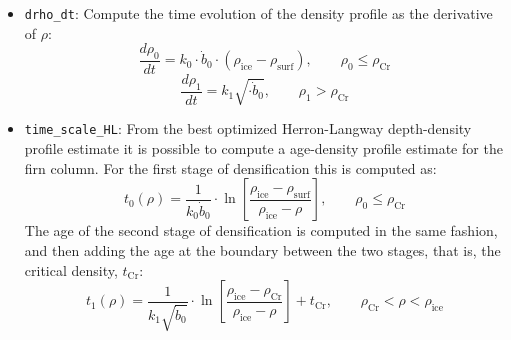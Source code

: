 \documentclass[../../CompleteThesis/Complete_1stDraft.tex]{subfiles}
\begin{document}
\begin{itemize}
	\item \lstinline[columns=fixed]|drho_dt|: Compute the time evolution of the density profile as the derivative of $\rho$:
	\begin{equation}
		\frac{d\rho_0}{dt} = k_0 \cdot\dot{b}_0\cdot (\rho_{\text{ice}} - \rho_{\text{surf}}), \qquad \rho_0 \leq \rho_{\text{Cr}}
	\end{equation}
	\begin{equation}
		\frac{d\rho_1}{dt} = k_1 \sqrt{\cdot\dot{b}_0}, \qquad \rho_1 > \rho_{\text{Cr}}
	\end{equation}	
	\item \lstinline[columns=fixed]|time_scale_HL|: From the best optimized Herron-Langway depth-density profile estimate it is possible to compute a age-density profile estimate for the firn column. For the first stage of densification this is computed as:
	\begin{equation}
		t_0(\rho) = \frac{1}{k_0 \dot{b}_0} \cdot \ln\left[\frac{\rho_{\text{ice}} - \rho_{\text{surf}}}{\rho_{\text{ice}} - \rho}\right], \qquad \rho_0 \leq \rho_{\text{Cr}}
	\end{equation}
	The age of the second stage of densification is computed in the same fashion, and then adding the age at the boundary between the two stages, that is, the critical density, $t_{\text{Cr}}$:
	\begin{equation}
		t_1(\rho) = \frac{1}{k_1 \sqrt{\dot{b}_0}}\cdot\ln\left[\frac{\rho_{\text{ice}} - \rho_{\text{Cr}}}{\rho_{\text{ice}} - \rho}\right] + t_{\text{Cr}}, \qquad \rho_{\text{Cr}} < \rho < \rho_{\text{ice}}
	\end{equation}
\end{itemize}
\end{document}
